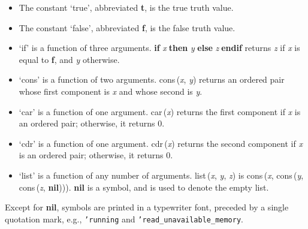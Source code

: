 \begin{itemize}

\item The constant `true', abbreviated {\bf{t}}, is the true truth value.

\item The constant `false', abbreviated {\bf{f}}, is the false truth value.

\item `if' is a function of three arguments.  {\bf if }{\it{x\/}}$\;${\bf then }{\it{y\/}} {\bf else }{\it{z\/}}$\;${\bf  endif} returns {\it{z\/}} if {\it{x\/}} is
equal to {\bf{f}}, and {\it{y\/}} otherwise.

\item `cons' is a function of two arguments.  {\rm{cons}}\,({\it{x\/}}, {\it{y\/}}) returns an ordered
pair whose first component is {\it{x\/}} and whose second is {\it{y\/}}.

\item `car' is a function of one argument.  {\rm{car}}\,({\it{x\/}}) returns the first component
if {\it{x\/}} is an ordered pair;  otherwise, it returns 0.

\item `cdr' is a function of one argument.  {\rm{cdr}}\,({\it{x\/}}) returns the second component
if {\it{x\/}} is an ordered pair;  otherwise, it returns 0.

\item `list' is a function of any number of arguments. {\rm{list}}\,({\it{x\/}}, {\it{y\/}}, {\it{z\/}}) is {\rm{cons}}\,({\it{x\/}}, {\rm{cons}}\,({\it{y\/}}, {\rm{cons}}\,({\it{z\/}}, {\bf{nil}}))).  {\bf{nil}} is a symbol, and is used to denote the empty
list.

\end{itemize}

Except for {\bf{nil}}, symbols are printed in a typewriter font, preceded by a single
quotation mark, e.g., {\tt{'}}{\tt{running}} and {\tt{'}}{\tt{read\_unavailable\_memory}}.


%
%
%
%
%
%
%

